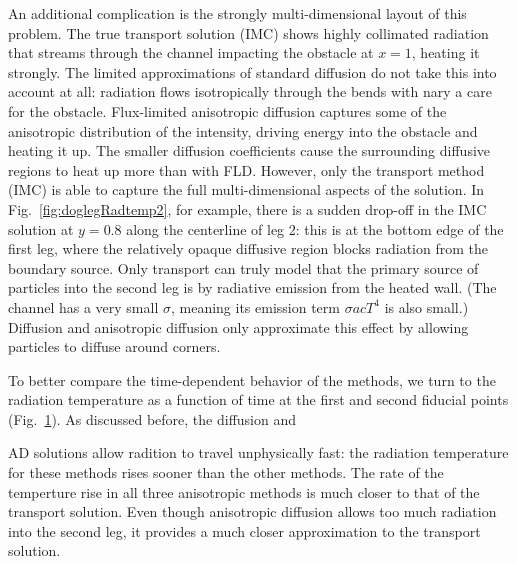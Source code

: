 An additional complication is the strongly multi-dimensional layout of this
problem. The true transport solution (IMC) shows highly collimated radiation
that streams through the channel impacting the obstacle at $x=1$, heating it
strongly. The limited approximations of standard diffusion do not take this into
account at all: radiation flows isotropically through the bends with nary a care
for the obstacle. Flux-limited anisotropic diffusion captures some of the
anisotropic distribution of the intensity, driving energy into the obstacle and
heating it up. The smaller diffusion coefficients cause the surrounding
diffusive regions to heat up more than with FLD. However, only the transport
method (IMC) is able to capture the full multi-dimensional aspects of the
solution. In Fig.~\ref{fig:doglegRadtemp2}, for example, there is a sudden
drop-off in the IMC solution at $y=0.8$ along the centerline of leg 2: this is
at the bottom edge of the first leg, where the relatively opaque diffusive
region blocks radiation from the boundary source. Only transport can truly
model that the primary source of particles into the second leg is by radiative
emission from the heated wall. (The channel has a very small $\sigma$, meaning
its emission term $\sigma a c T^4$ is also small.) Diffusion and anisotropic
diffusion only approximate this effect by allowing particles to diffuse around
corners.

To better compare the time-dependent behavior of the methods, we turn to
the radiation temperature as a function of time at the first and second fiducial
points (Fig.~\ref{fig:doglegFiducial}). As discussed before, the diffusion and
%
\begin{figure}[htb]
  \centering\small
  \subfloat[$x=0.9$, $y=1.0$]{%
    \hspace{-.25in}%
    
  }%
  \subfloat[$x=0.9$, $y=0.3$]{%
    \hspace{-.25in}%
    
  }%
  \label{fig:doglegFiducial}
\end{figure}
%
AD solutions allow radition to travel unphysically fast: the radiation
temperature for these methods rises sooner than the other methods. The rate of
the temperture rise in all three anisotropic methods is much closer to that of
the transport solution. Even though anisotropic diffusion allows too much
radiation into the second leg, it provides a much closer approximation to the
transport solution.

